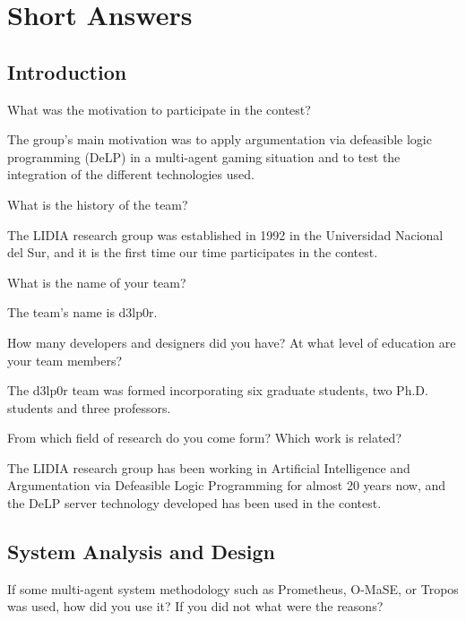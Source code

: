 
\section{Short Answers}


\subsection{Introduction}

\begin{question}
What was the motivation to participate in the contest?  
\end{question}

The group's main motivation was to apply argumentation via defeasible 
logic programming (DeLP) in a multi-agent gaming situation and to test the
integration of the different technologies used.

\begin{question}
What is the history of the team?  
\end{question}

The LIDIA research group was established in 1992 in the Universidad 
Nacional del Sur, and it is the first time our time participates in the 
contest.

\begin{question}
What is the name of your team?  
\end{question}

The team's name is d3lp0r.

\begin{question}
How many developers and designers did you have?  At what level of education
are your team members?  
\end{question}

The d3lp0r team was formed incorporating six graduate
students, two Ph.D. students and three professors.

\begin{question}
From which field of research do you come form?  Which work is related?  
\end{question}

The
LIDIA research group has been working in Artificial Intelligence and
Argumentation via Defeasible Logic Programming for almost 20 years now, and
the DeLP server technology developed has been used in the contest.

\subsection{System Analysis and Design}
\setcounter{question}{0}
\begin{question}
If some multi-agent system methodology such
as Prometheus, O-MaSE, or Tropos was used, how did you use it? If you did not
what were the reasons?  
\end{question}

